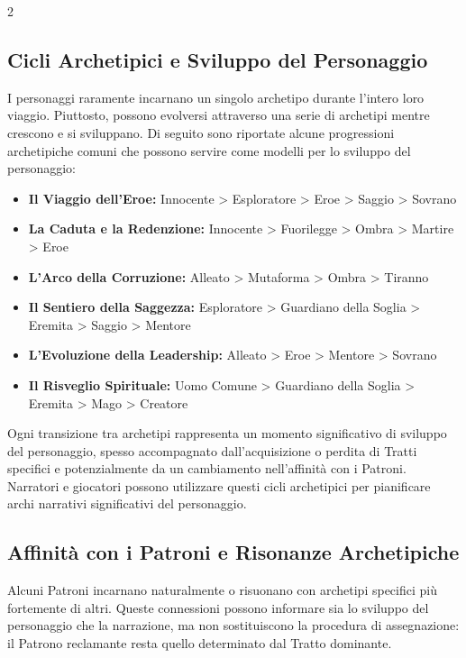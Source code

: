 \begin{multicols}{2}
\subsection*{Cicli Archetipici e Sviluppo del Personaggio}

I personaggi raramente incarnano un singolo archetipo durante l'intero loro viaggio. Piuttosto, possono evolversi attraverso una serie di archetipi mentre crescono e si sviluppano. Di seguito sono riportate alcune progressioni archetipiche comuni che possono servire come modelli per lo sviluppo del personaggio:

\noindent\begin{itemize}[leftmargin=*] \setlength{\itemsep}{0pt}
\item \textbf{Il Viaggio dell'Eroe:} Innocente > Esploratore > Eroe > Saggio > Sovrano
\item \textbf{La Caduta e la Redenzione:} Innocente > Fuorilegge > Ombra > Martire > Eroe
\item \textbf{L'Arco della Corruzione:} Alleato > Mutaforma > Ombra > Tiranno
\item \textbf{Il Sentiero della Saggezza:} Esploratore > Guardiano della Soglia > Eremita > Saggio > Mentore
\item \textbf{L'Evoluzione della Leadership:} Alleato > Eroe > Mentore > Sovrano
\item \textbf{Il Risveglio Spirituale:} Uomo Comune > Guardiano della Soglia > Eremita > Mago > Creatore
\end{itemize}

Ogni transizione tra archetipi rappresenta un momento significativo di sviluppo del personaggio, spesso accompagnato dall'acquisizione o perdita di Tratti specifici e potenzialmente da un cambiamento nell'affinità con i Patroni. Narratori e giocatori possono utilizzare questi cicli archetipici per pianificare archi narrativi significativi del personaggio.

\subsection*{Affinità con i Patroni e Risonanze Archetipiche}

Alcuni Patroni incarnano naturalmente o risuonano con archetipi specifici più fortemente di altri. Queste connessioni possono informare sia lo sviluppo del personaggio che la narrazione, ma non sostituiscono la procedura di assegnazione: il Patrono reclamante resta quello determinato dal Tratto dominante.


\end{multicols}
